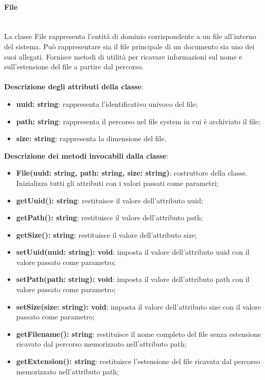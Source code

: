 \documentclass[a4paper,12pt]{article}
\begin{document}
{{{                \paragraph{File}\label{par:File}\mbox{}\\
                La classe File rappresenta l'entità di dominio corrispondente a un file all'interno del sistema. Può rappresentare sia il file principale di un documento sia uno dei suoi allegati. Fornisce metodi di utilità per ricavare informazioni sul nome e sull'estensione del file a partire dal percorso.\\
                \\
                \textbf{Descrizione degli attributi della classe}:
                \begin{itemize}
                    \item \textbf{uuid: string}: rappresenta l'identificativo univoco del file;
                    \item \textbf{path: string}: rappresenta il percorso nel file system in cui è archiviato il file;
                    \item \textbf{size: string}: rappresenta la dimensione del file.
                \end{itemize}
 
              \noindent \textbf{Descrizione dei metodi invocabili dalla classe}:
                \begin{itemize}
                    \item \textbf{File(uuid: string, path: string, size: string)}: costruttore della classe. Inizializza tutti gli attributi con i valori passati come parametri;
                    \item \textbf{getUuid(): string}: restituisce il valore dell'attributo uuid;
                    \item \textbf{getPath(): string}: restituisce il valore dell'attributo path;
                    \item \textbf{getSize(): string}: restituisce il valore dell'attributo size;
                    \item \textbf{setUuid(uuid: string): void}: imposta il valore dell'attributo uuid con il valore passato come parametro;
                    \item \textbf{setPath(path: string): void}: imposta il valore dell'attributo path con il valore passato come parametro;
                    \item \textbf{setSize(size: string): void}: imposta il valore dell'attributo size con il valore passato come parametro;
                    \item \textbf{getFilename(): string}: restituisce il nome completo del file senza estensione ricavato dal percorso memorizzato nell'attributo path;
                    \item \textbf{getExtension(): string}: restituisce l'estensione del file ricavata dal percorso memorizzato nell'attributo path;
                \end{itemize}
}}}
\end{document}
